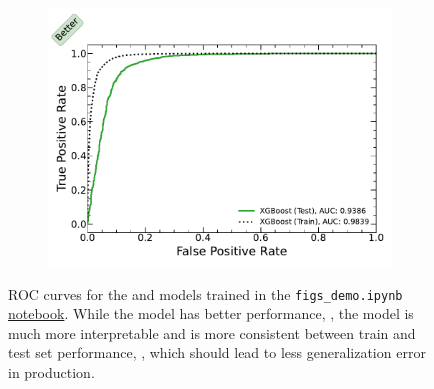 \begin{figure}[H]
  \begin{subfigure}[b]{0.48\textwidth}\centering
      \includegraphics[width=\textwidth]{figures/ml/figs_demo/roc_xgboost_test_train}
  \caption{\xgboost}
  \label{fig:FIGS:demo_roc:xgboost}
  \end{subfigure}
\caption{
ROC curves for the \figs and \xgboost models trained in the
\texttt{figs\_demo.ipynb} \href{https://github.com/mepland/data_science_notes/blob/main/plots/figs_demo.ipynb}{notebook}.
While the \xgboost model has better performance, ,
the \figs model is much more interpretable and
is more consistent between train and test set performance, ,
which should lead to less generalization error in production.
\label{fig:FIGS:demo_roc}
}
\end{figure}
